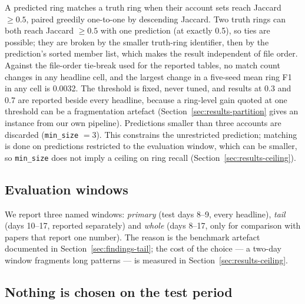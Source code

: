 A predicted ring matches a truth ring when their account sets reach Jaccard $\ge 0.5$, paired
greedily one-to-one by descending Jaccard. Two truth rings can both reach Jaccard $\ge 0.5$ with one
prediction (at exactly 0.5), so ties are possible; they are broken by the smaller truth-ring
identifier, then by the prediction's sorted member list, which makes the result independent of file
order. Against the file-order tie-break used for the reported tables, no match count changes in any
headline cell, and the largest change in a five-seed mean ring F1 in any cell is 0.0032.
The threshold is fixed, never tuned, and results at 0.3 and 0.7 are reported beside every
headline, because a ring-level gain quoted at one threshold can be a fragmentation artefact
(Section~\ref{sec:results-partition} gives an instance from our own pipeline). Predictions
smaller than three accounts are discarded (\texttt{min\_size} $=3$). This constrains the
unrestricted prediction; matching is done on predictions restricted to the evaluation window,
which can be smaller, so \texttt{min\_size} does not imply a ceiling on ring recall
(Section~\ref{sec:results-ceiling}).

\subsection{Evaluation windows}
\label{sec:data-windows}

We report three named windows: \emph{primary} (test days 8--9, every headline), \emph{tail}
(days 10--17, reported separately) and \emph{whole} (days 8--17, only for comparison with
papers that report one number). The reason is the benchmark artefact documented in
Section~\ref{sec:findings-tail}; the cost of the choice --- a two-day window fragments long
patterns --- is measured in Section~\ref{sec:results-ceiling}.

\subsection{Nothing is chosen on the test period}

